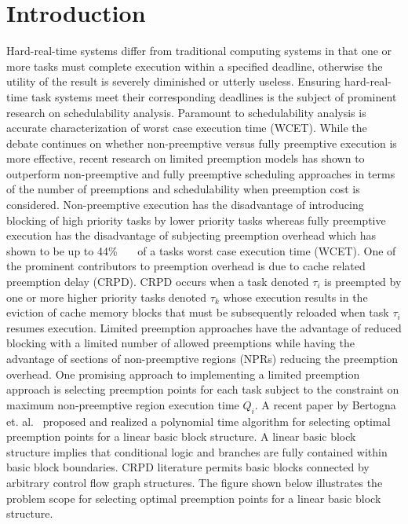 \section{Introduction}\label{sec:introduction}

Hard-real-time systems differ from traditional computing systems in that one or more tasks must complete execution within a specified deadline, otherwise the utility of the result is severely diminished or utterly useless.  Ensuring hard-real-time task systems meet their corresponding deadlines is the subject of prominent research on schedulability analysis.  Paramount to schedulability analysis is accurate characterization of worst case execution time (WCET).  While the debate continues on whether non-preemptive versus fully preemptive execution is more effective, recent research on limited preemption models has shown to outperform non-preemptive and fully preemptive scheduling approaches in terms of the number of preemptions and schedulability when preemption cost is considered.  Non-preemptive execution has the disadvantage of introducing blocking of high priority tasks by lower priority tasks whereas fully preemptive execution has the disadvantage of subjecting preemption overhead which has shown to be up to 44\%~\cite{pellizzoni:07}~\cite{pellizzoni:08}~\cite{pellizzoni:11} of a tasks worst case execution time (WCET).  One of the prominent contributors to preemption overhead is due to cache related preemption delay (CRPD).  CRPD occurs when a task denoted \begin{math}\tau_{i}\end{math} is preempted by one or more higher priority tasks denoted \begin{math}\tau_{k}\end{math} whose execution results in the eviction of cache memory blocks that must be subsequently reloaded when task \begin{math}\tau_{i}\end{math} resumes execution.  Limited preemption approaches have the advantage of reduced blocking with a limited number of allowed preemptions while having the advantage of sections of non-preemptive regions (NPRs) reducing the preemption overhead.  One promising approach to implementing a limited preemption approach is selecting preemption points for each task subject to the constraint on maximum non-preemptive region execution time \begin{math}Q_{i}\end{math}.  A recent paper by Bertogna et. al.~\cite{bertogna:11} proposed and realized a polynomial time algorithm for selecting optimal preemption points for a linear basic block structure.  A linear basic block structure implies that conditional logic and branches are fully contained within basic block boundaries. CRPD literature permits basic blocks connected by arbitrary control flow graph structures.  The figure shown below illustrates the problem scope for selecting optimal preemption points for a linear basic block structure.

